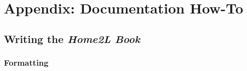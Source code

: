 \documentclass[12pt,english,parskip=half,headheight=19pt]{scrreprt}
\begin{document}
\appendix





%
\chapter{Appendix: Documentation How-To}
%



\section{Writing the \textit{Home2L Book}}
\label{sec:documenting-the_book}


\subsection{Formatting}
\end{document}
